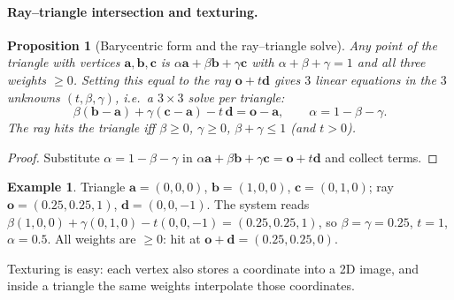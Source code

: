 \documentclass[11pt,a4paper]{article}
\newcommand{\vo}{\bm{o}}
\newcommand{\vd}{\bm{d}}
\newcommand{\va}{\bm{a}}
\newcommand{\vb}{\bm{b}}
\newcommand{\vc}{\bm{c}}
\theoremstyle{definition}
\newtheorem{example}[definition]{Example}
\theoremstyle{plain}
\newtheorem{proposition}[definition]{Proposition}
\theoremstyle{remark}
\begin{document}
\paragraph{Ray--triangle intersection and texturing.}
\begin{proposition}[Barycentric form and the ray--triangle solve]\label{prop:ray}
Any point of the triangle with vertices $\va,\vb,\vc$ is $\alpha\va+\beta\vb+\gamma\vc$ with $\alpha+\beta+\gamma=1$ and all three weights $\ge 0$. Setting this equal to the ray $\vo+t\vd$ gives $3$ linear equations in the $3$ unknowns $(t,\beta,\gamma)$, i.e.\ a $3\times 3$ solve per triangle:
\[
\beta(\vb-\va)+\gamma(\vc-\va)-t\,\vd=\vo-\va ,\qquad \alpha=1-\beta-\gamma .
\]
The ray hits the triangle iff $\beta\ge0$, $\gamma\ge0$, $\beta+\gamma\le 1$ (and $t>0$).
\end{proposition}
\begin{proof}
Substitute $\alpha=1-\beta-\gamma$ in $\alpha\va+\beta\vb+\gamma\vc=\vo+t\vd$ and collect terms.
\end{proof}

\begin{example}
Triangle $\va=(0,0,0)$, $\vb=(1,0,0)$, $\vc=(0,1,0)$; ray $\vo=(0.25,0.25,1)$, $\vd=(0,0,-1)$. The system reads $\beta(1,0,0)+\gamma(0,1,0)-t(0,0,-1)=(0.25,0.25,1)$, so $\beta=\gamma=0.25$, $t=1$, $\alpha=0.5$. All weights are $\ge0$: hit at $\vo+\vd=(0.25,0.25,0)$.
\end{example}

Texturing is easy: each vertex also stores a coordinate into a 2D image, and inside a triangle the same weights interpolate those coordinates.
\end{document}
